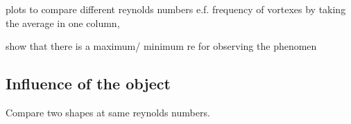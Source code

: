 plots to compare different reynolds numbers e.f. frequency of vortexes by taking the average in one column,

show that there is a maximum/ minimum re for observing the phenomen


\subsection{Influence of the object}

Compare two shapes at same reynolds numbers.
